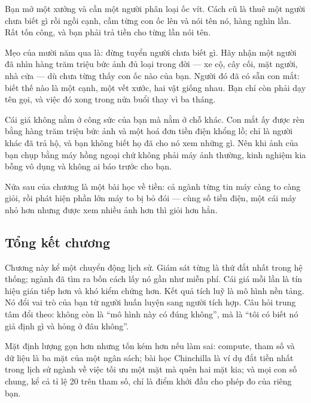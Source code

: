 \documentclass[../../deep_learning.tex]{subfiles}
\begin{document}
\begin{dongian}
Bạn mở một xưởng và cần một người phân loại ốc vít. Cách cũ là thuê một người chưa biết gì rồi ngồi cạnh, cầm từng con ốc lên và nói tên nó, hàng nghìn lần. Rất tốn công, và bạn phải trả tiền cho từng lần nói tên.

Mẹo của mười năm qua là: đừng tuyển người chưa biết gì. Hãy nhận một người đã nhìn hàng trăm triệu bức ảnh đủ loại trong đời --- xe cộ, cây cối, mặt người, nhà cửa --- dù chưa từng thấy con ốc nào của bạn. Người đó đã có sẵn con mắt: biết thế nào là một cạnh, một vết xước, hai vật giống nhau. Bạn chỉ còn phải dạy tên gọi, và việc đó xong trong nửa buổi thay vì ba tháng.

Cái giá không nằm ở công sức của bạn mà nằm ở chỗ khác. Con mắt ấy được rèn bằng hàng trăm triệu bức ảnh và một hoá đơn tiền điện khổng lồ; chỉ là người khác đã trả hộ, và bạn không biết họ đã cho nó xem những gì. Nên khi ảnh của bạn chụp bằng máy hồng ngoại chứ không phải máy ảnh thường, kinh nghiệm kia bỗng vô dụng và không ai báo trước cho bạn.

Nửa sau của chương là một bài học về tiền: cả ngành từng tin máy càng to càng giỏi, rồi phát hiện phần lớn máy to bị bỏ đói --- cùng số tiền điện, một cái máy nhỏ hơn nhưng được xem nhiều ảnh hơn thì giỏi hơn hẳn.

\end{dongian}

\subsection*{Tổng kết chương}
Chương này kể một chuyển động lịch sử. Giám sát từng là thứ đắt nhất trong hệ thống; ngành đã tìm ra bốn cách lấy nó gần như miễn phí. Cái giá mỗi lần là tín hiệu gián tiếp hơn và khó kiểm chứng hơn. Kết quả tích luỹ là mô hình nền tảng. Nó đổi vai trò của bạn từ người huấn luyện sang người tích hợp. Câu hỏi trung tâm đổi theo: không còn là ``mô hình này có đúng không'', mà là ``tôi có biết nó giả định gì và hỏng ở đâu không''.

Mặt định lượng gọn hơn nhưng tốn kém hơn nếu làm sai: compute, tham số và dữ liệu là ba mặt của một ngân sách; bài học Chinchilla là ví dụ đắt tiền nhất trong lịch sử ngành về việc tối ưu một mặt mà quên hai mặt kia; và mọi con số chung, kể cả tỉ lệ 20  trên tham số, chỉ là điểm khởi đầu cho phép đo của riêng bạn.
\end{document}

